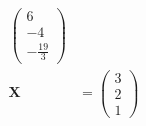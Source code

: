 \documentclass{article}
\begin{document}
\begin{align*}
\begin{pmatrix}
                                    6  \\
                                    -4 \\
                                    -\frac{19}{3}
                                  \end{pmatrix}   \\
  \mathbf{X}                    & = \begin{pmatrix}
                                      3 \\
                                      2 \\
                                      1
                                    \end{pmatrix}
\end{align*}
\end{document}
